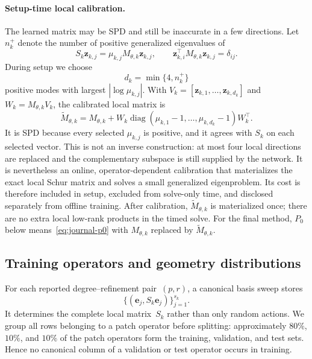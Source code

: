 \documentclass{article}
\newcommand{\vect}[1]{\boldsymbol{#1}}
\newcommand{\Sloc}[1]{S_{#1}}                    %
\theoremstyle{plain}
\numberwithin{equation}{section}
\begin{document}
\paragraph{Setup-time local calibration.}
The learned matrix may be SPD and still be inaccurate in a few directions.
Let $n_k^+$ denote the number of positive generalized eigenvalues of
\begin{equation}
    \Sloc{k}\vect z_{k,j}
    =\mu_{k,j}M_{\theta,k}\vect z_{k,j},
    \qquad
    \vect z_{k,i}^{\top}M_{\theta,k}\vect z_{k,j}=\delta_{ij}.
    \label{eq:journal-local-calibration-eigenproblem}
\end{equation}
During setup we choose
\[
    d_k=\min\{4,n_k^+\}
\]
positive modes with largest $|\log\mu_{k,j}|$.  With
$V_k=[\vect z_{k,1},\ldots,\vect z_{k,d_k}]$ and
$W_k=M_{\theta,k}V_k$, the calibrated local matrix is
\begin{equation}
    \widetilde M_{\theta,k}
    =M_{\theta,k}
    +W_k\operatorname{diag}(\mu_{k,1}-1,\ldots,\mu_{k,d_k}-1)W_k^\top.
    \label{eq:journal-local-calibration}
\end{equation}
It is SPD because every selected $\mu_{k,j}$ is positive, and it agrees with
$\Sloc{k}$ on each selected vector.  This is not an inverse construction:
at most four local directions are replaced and the complementary subspace is
still supplied by the network.  It is nevertheless an online,
operator-dependent calibration that materializes the exact local Schur matrix
and solves a small generalized eigenproblem.  Its cost is therefore included
in setup, excluded from solve-only time, and disclosed separately from offline
training.  After calibration, $\widetilde M_{\theta,k}$ is materialized once;
there are no extra local low-rank products in the timed solve.
For the final method, $P_0$ below means~\eqref{eq:journal-p0} with
$M_{\theta,k}$ replaced by $\widetilde M_{\theta,k}$.

\subsection{Training operators and geometry distributions}
\label{subsec:native-data}

For each reported degree--refinement pair~$(p,r)$, a canonical basis sweep
stores
\[
    \{(\vect e_j,\Sloc{k}\vect e_j)\}_{j=1}^{s_k}.
\]
It determines the complete local matrix~$\Sloc{k}$ rather than only random
actions.  We group all rows belonging to a patch operator before splitting:
approximately $80\%$, $10\%$, and $10\%$ of the patch operators form the
training, validation, and test sets.  Hence no canonical column of a
validation or test operator occurs in training.
\end{document}
